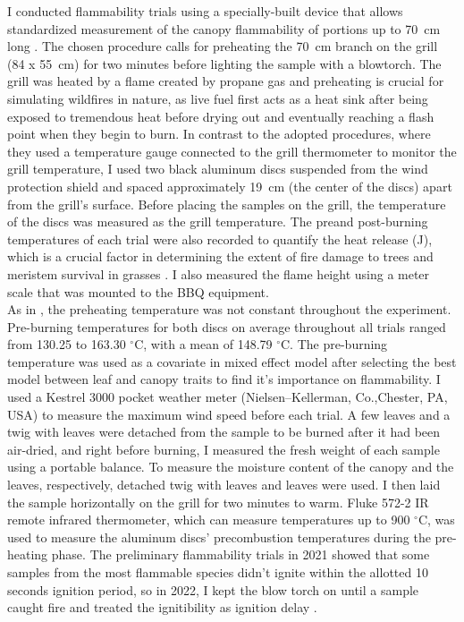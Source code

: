\documentclass[12pt]{report}
\begin{document}
I conducted flammability trials using a specially-built device that allows standardized measurement of the canopy flammability of portions up to 70 \,cm long \citep{jaureguiberry2011device}. The chosen procedure calls for preheating the 70 \,cm branch on the grill (84 x 55 \,cm) for two minutes before lighting the sample with a blowtorch. The grill was heated by a flame created by propane gas and preheating is crucial for simulating wildfires in nature, as live fuel first acts as a heat sink after being exposed to tremendous heat before drying out and eventually reaching a flash point when they begin to burn. In contrast to the adopted procedures, where they used a temperature gauge connected to the grill thermometer to monitor the grill temperature, I used two black aluminum discs \citep{gao2022burn} suspended from the wind protection shield and spaced approximately 19 \,cm (the center of the discs) apart from the grill's surface. Before placing the samples on the grill, the temperature of the discs was measured as the grill temperature. The pre\-and post-burning temperatures of each trial were also recorded to quantify the heat release (J), which is a crucial factor in determining the extent of fire damage to trees and meristem survival in grasses \citep{bowman2018differential, choczynska2009soil}. I also measured the flame height using a meter scale that was mounted to the BBQ equipment.\\

As in \citep{wyse2016quantitative}, the preheating temperature was not constant throughout the experiment. Pre-burning temperatures for both discs on average throughout all trials ranged from 130.25 to 163.30 $^{\circ}$C, with a mean of 148.79 $^{\circ}$C. The pre-burning temperature was used as a covariate in mixed effect model after selecting the best model between leaf and canopy traits to find it's importance on flammability. I used a Kestrel 3000 pocket weather meter (Nielsen–Kellerman, Co.,Chester, PA, USA) to measure the maximum wind speed before each trial. A few leaves and a twig with leaves were detached from the sample to be burned after it had been air-dried, and right before burning, I measured the fresh weight of each sample using a portable balance. To measure the moisture content of the canopy and the leaves, respectively, detached twig with leaves and leaves were used. I then laid the sample horizontally on the grill for two minutes to warm. Fluke 572-2 IR remote infrared thermometer, which can measure temperatures up to 900 $^{\circ}$C, was used to measure the aluminum discs' precombustion temperatures during the pre-heating phase. The preliminary flammability trials in 2021 showed that some samples from the most flammable species didn't ignite within the allotted 10 seconds ignition period, so in 2022, I kept the blow torch on until a sample caught fire and treated the ignitibility as ignition delay \citep{anderson1970forest}.
\end{document}
